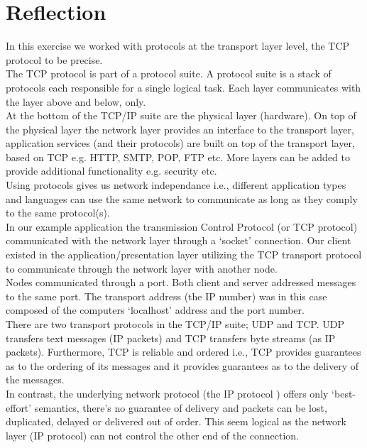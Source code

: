 \section{Reflection}
\label{tcp_reflection}

In this exercise we worked with protocols at the transport layer level, the TCP protocol to be precise. \\

The TCP protocol is part of a protocol suite. A protocol suite is a stack of protocols each responsible for a single logical task. 
Each layer communicates with the layer above and below, only. \\

At the bottom of the TCP/IP suite are the physical layer (hardware). On top of the physical layer the network layer provides an interface to the transport layer, application services (and their protocols) are built on top of the transport layer, based on TCP e.g. HTTP, SMTP, POP, FTP etc. 
More layers can be added to provide additional functionality e.g. security etc.\\

Using protocols gives us network independance i.e., different application types and languages can use the same network to communicate 
as long as they comply to the same protocol(s). \\

In our example application the transmission Control Protocol (or TCP protocol) communicated with the network layer through a ‘socket’ connection. Our client existed in the application/presentation layer utilizing the TCP transport protocol to communicate through the network layer with another node.  \\

Nodes communicated through a port. Both client and server addressed messages to the same port. The transport address (the IP number) was in this case composed of the computers  ‘localhost’ address and the port number. \\

There are two transport protocols in the TCP/IP suite; UDP and TCP. UDP transfers text messages (IP packets) and TCP transfers byte streams (as IP packets). Furthermore, TCP is reliable and ordered i.e., TCP provides guarantees as to the ordering of its messages and it provides guarantees as to the delivery of the messages. \\

In contrast, the underlying network protocol (the IP protocol ) offers only ‘best-effort’ semantics, there’s no guarantee of delivery and packets can be lost, duplicated, delayed or delivered out of order. This seem logical as the network layer (IP protocol) can not control the other end of the connection. 

